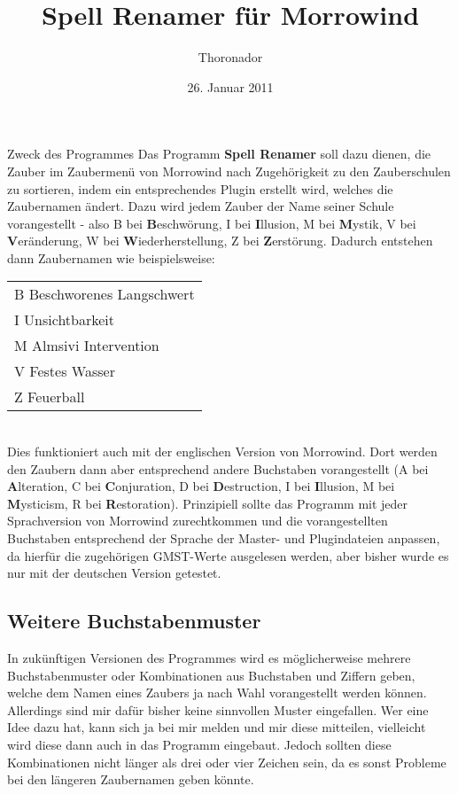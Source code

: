 \documentclass[12pt,twoside,a4paper]{article}
\title{Spell Renamer f\"{u}r Morrowind}
\author{Thoronador}
\date{26. Januar 2011}
\begin{document}
\maketitle

\begin{section}{Zweck des Programmes}
Das Programm \textbf{Spell Renamer} soll dazu dienen, die Zauber im Zaubermen\"{u}
von Morrowind nach Zugeh\"{o}rigkeit zu den Zauberschulen zu sortieren, indem
ein entsprechendes Plugin erstellt wird, welches die Zaubernamen \"{a}ndert.
Dazu wird jedem Zauber der Name seiner Schule vorangestellt - also B bei
\textbf{B}eschw\"{o}rung, I bei \textbf{I}llusion, M bei \textbf{M}ystik, V bei
\textbf{V}er\"{a}nderung, W bei \textbf{W}iederherstellung, Z bei
\textbf{Z}erst\"{o}rung.
Dadurch entstehen dann Zau\-ber\-na\-men wie beispielsweise:\\

\begin{tabular}{l}
B Beschworenes Langschwert\\
I Unsichtbarkeit\\
M Almsivi Intervention\\
V Festes Wasser\\
Z Feuerball\\
\end{tabular}
\\

Dies funktioniert auch mit der englischen Version von Morrowind. Dort werden
den Zaubern dann aber entsprechend andere Buchstaben vorangestellt (A bei
\textbf{A}lteration, C bei \textbf{C}onjuration, D bei \textbf{D}estruction,
I bei \textbf{I}llusion, M bei \textbf{M}ysticism, R bei \textbf{R}estoration).
Prinzipiell sollte das Programm mit jeder Sprachversion von Morrowind zurechtkommen
und die vorangestellten Buchstaben entsprechend der Sprache der Master- und
Plugindateien anpassen, da hierf\"{u}r die zugeh\"{o}rigen GMST-Werte ausgelesen werden,
aber bisher wurde es nur mit der deutschen Version getestet.

\subsection{Weitere Buchstabenmuster}
In zuk\"{u}nftigen Versionen des Programmes wird es m\"{o}glicherweise mehrere
Buchstabenmuster oder Kombinationen aus Buchstaben und Ziffern geben, welche
dem Namen eines Zaubers ja nach Wahl vorangestellt werden k\"{o}nnen. Allerdings
sind mir daf\"{u}r bisher keine sinnvollen Muster eingefallen. Wer eine Idee dazu
hat, kann sich ja bei mir melden und mir diese mitteilen, vielleicht wird diese
dann auch in das Programm eingebaut. Jedoch sollten diese Kombinationen nicht
l\"{a}nger als drei oder vier Zeichen sein, da es sonst Probleme bei den l\"{a}ngeren
Zaubernamen geben k\"{o}nnte.


\end{section}
\end{document}
